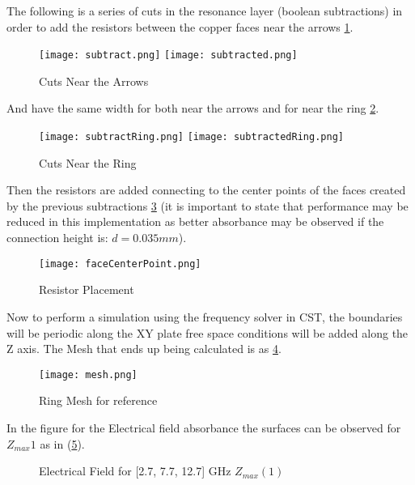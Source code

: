         The following is a series of cuts in the resonance layer (boolean subtractions)
        in order to add the resistors between the copper faces near the arrows \ref{img:arrowCuts}.
        \begin{figure}[h]
            \centering
            \texttt{[image: subtract.png]}\hfil
            \texttt{[image: subtracted.png]}
            \caption{Cuts Near the Arrows}
            \label{img:arrowCuts}
        \end{figure}

        And have the same width for both near the arrows and for near the ring \ref{img:ringCuts}.
        \begin{figure}[h]
            \centering
            \texttt{[image: subtractRing.png]}\hfil
            \texttt{[image: subtractedRing.png]}
            \caption{Cuts Near the Ring}
            \label{img:ringCuts}
        \end{figure}

        Then the resistors are added connecting to the center points of the faces
        created by the previous subtractions \ref{img:resistors} (it is important
        to state that performance may be reduced in this implementation as better
        absorbance may be observed if the connection height is: $d=0.035mm$).
        \begin{figure}[h]
            \centering
            \texttt{[image: faceCenterPoint.png]}
            \caption{Resistor Placement}
            \label{img:resistors}
        \end{figure}

        Now to perform a simulation using the frequency solver in CST, the boundaries will be periodic
        along the XY plate free space conditions will be added along the Z axis.
        The Mesh that ends up being calculated is as \ref{img:RingAndArrowMesh}.

        \begin{figure}[h]
            \centering
            \texttt{[image: mesh.png]}
            \caption{Ring Mesh for reference}
            \label{img:RingAndArrowMesh}
        \end{figure}

        In the figure for the Electrical field absorbance the surfaces can be observed for $Z_{max}1$
        as in (\ref{img:E_Zmax1}).
        \begin{figure}[h]
            \centering
             \hfil
             \hfil

            \caption{Electrical Field for [2.7, 7.7, 12.7] GHz $Z_{max}(1)$}
            \label{img:E_Zmax1}
        \end{figure}

